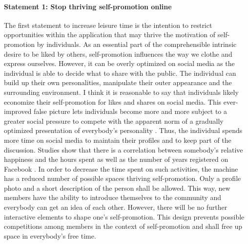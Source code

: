 \documentclass[12pt,numbers=noenddot,parskip,bibliography=totocnumbered,listof=totocnumbered,draft]{scrreprt}
\begin{document}
\paragraph{Statement 1: Stop thriving self-promotion online}
The first statement to increase leisure time is the intention to restrict opportunities within the application that may thrive the motivation of self-promotion by individuals. As an essential part of the comprehensible intrinsic desire to be liked by others, self-promotion influences the way we clothe and express ourselves. However, it can be overly optimized on social media as the individual is able to decide what to share with the public. The individual can build up their own personalities, manipulate their outer appearance and the surrounding environment. I think it is reasonable to say that individuals likely economize their self-promotion for likes and shares on social media. This ever-improved false picture lets individuals become more and more subject to a greater social pressure to compete with the apparent norm of a gradually optimized presentation of everybody's personality \citep{jay2012}. Thus, the individual spends more time on social media to maintain their profiles and to keep part of the discussion. Studies show that there is a correlation between somebody's relative happiness and the hours spent as well as the number of years registered on Facebook \citep[p.119]{chou2012}.\newline
In order to decrease the time spent on such activities, the machine has a reduced number of possible spaces thriving self-promotion. Only a profile photo and a short description of the person shall be allowed. This way, new members have the ability to introduce themselves to the community and everybody can get an idea of each other. However, there will be no further interactive elements to shape one's self-promotion. This design prevents possible competitions among members in the context of self-promotion and shall free up space in everybody's free time.
\end{document}
